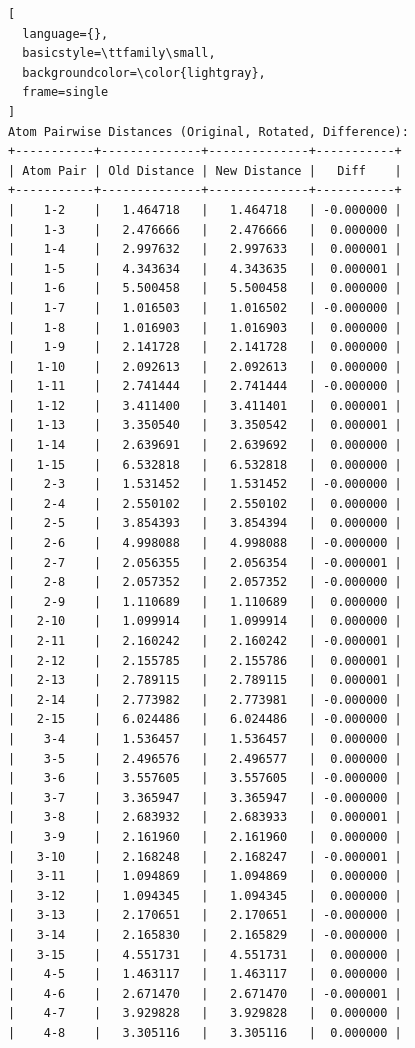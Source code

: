 \documentclass{article}
\begin{document}
\begin{lstlisting}[
  language={},
  basicstyle=\ttfamily\small,
  backgroundcolor=\color{lightgray},
  frame=single
]
Atom Pairwise Distances (Original, Rotated, Difference):
+-----------+--------------+--------------+-----------+
| Atom Pair | Old Distance | New Distance |   Diff    |
+-----------+--------------+--------------+-----------+
|    1-2    |   1.464718   |   1.464718   | -0.000000 |
|    1-3    |   2.476666   |   2.476666   |  0.000000 |
|    1-4    |   2.997632   |   2.997633   |  0.000001 |
|    1-5    |   4.343634   |   4.343635   |  0.000001 |
|    1-6    |   5.500458   |   5.500458   |  0.000000 |
|    1-7    |   1.016503   |   1.016502   | -0.000000 |
|    1-8    |   1.016903   |   1.016903   |  0.000000 |
|    1-9    |   2.141728   |   2.141728   |  0.000000 |
|   1-10    |   2.092613   |   2.092613   |  0.000000 |
|   1-11    |   2.741444   |   2.741444   | -0.000000 |
|   1-12    |   3.411400   |   3.411401   |  0.000001 |
|   1-13    |   3.350540   |   3.350542   |  0.000001 |
|   1-14    |   2.639691   |   2.639692   |  0.000000 |
|   1-15    |   6.532818   |   6.532818   |  0.000000 |
|    2-3    |   1.531452   |   1.531452   | -0.000000 |
|    2-4    |   2.550102   |   2.550102   |  0.000000 |
|    2-5    |   3.854393   |   3.854394   |  0.000000 |
|    2-6    |   4.998088   |   4.998088   | -0.000000 |
|    2-7    |   2.056355   |   2.056354   | -0.000001 |
|    2-8    |   2.057352   |   2.057352   | -0.000000 |
|    2-9    |   1.110689   |   1.110689   |  0.000000 |
|   2-10    |   1.099914   |   1.099914   |  0.000000 |
|   2-11    |   2.160242   |   2.160242   | -0.000001 |
|   2-12    |   2.155785   |   2.155786   |  0.000001 |
|   2-13    |   2.789115   |   2.789115   |  0.000001 |
|   2-14    |   2.773982   |   2.773981   | -0.000000 |
|   2-15    |   6.024486   |   6.024486   | -0.000000 |
|    3-4    |   1.536457   |   1.536457   |  0.000000 |
|    3-5    |   2.496576   |   2.496577   |  0.000000 |
|    3-6    |   3.557605   |   3.557605   | -0.000000 |
|    3-7    |   3.365947   |   3.365947   | -0.000000 |
|    3-8    |   2.683932   |   2.683933   |  0.000001 |
|    3-9    |   2.161960   |   2.161960   |  0.000000 |
|   3-10    |   2.168248   |   2.168247   | -0.000001 |
|   3-11    |   1.094869   |   1.094869   |  0.000000 |
|   3-12    |   1.094345   |   1.094345   |  0.000000 |
|   3-13    |   2.170651   |   2.170651   | -0.000000 |
|   3-14    |   2.165830   |   2.165829   | -0.000000 |
|   3-15    |   4.551731   |   4.551731   |  0.000000 |
|    4-5    |   1.463117   |   1.463117   |  0.000000 |
|    4-6    |   2.671470   |   2.671470   | -0.000001 |
|    4-7    |   3.929828   |   3.929828   |  0.000000 |
|    4-8    |   3.305116   |   3.305116   |  0.000000 |

\end{lstlisting}
\end{document}
